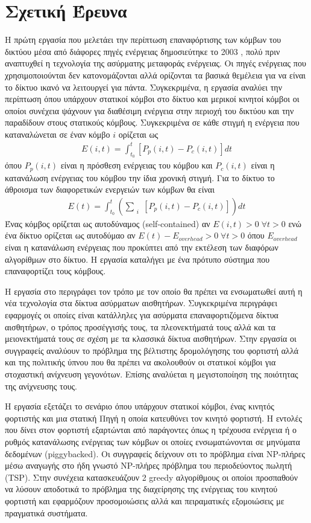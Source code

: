 \section{Σχετική Έρευνα}
Η πρώτη εργασία που μελετάει την περίπτωση επαναφόρτισης των κόμβων του δικτύου μέσα από διάφορες πηγές ενέργειας δημοσιεύτηκε το 2003 \cite{estrin_recharge}, πολύ
πριν αναπτυχθεί η τεχνολογία της ασύρματης μεταφοράς ενέργειας. Οι πηγές ενέργειας που χρησιμοποιούνται δεν κατονομάζονται αλλά ορίζονται τα βασικά θεμέλεια για να
είναι το δίκτυο ικανό να λειτουργεί για πάντα. Συγκεκριμένα, η εργασία αναλύει την περίπτωση όπου υπάρχουν στατικοί κόμβοι στο δίκτυο και μερικοί κινητοί κόμβοι οι
οποίοι συνέχεια ψάχνουν για διαθέσιμη ενέργεια στην περιοχή του δικτύου και την παραδίδουν στους στατικούς κόμβους.
Συγκεκριμένα σε κάθε στιγμή η ενέργεια που καταναλώνεται σε έναν κόμβο $i$ ορίζεται ως
\begin{align*}
E(i,t)=\int^{t}_{t_{0}}[P_{p}(i,t)-P_{c}(i,t)]dt
\end{align*}
όπου $P_{p}(i,t)$ είναι η πρόσθεση ενέργειας του κόμβου και $P_{c}(i,t)$ είναι η κατανάλωση ενέργειας του κόμβου την ίδια χρονική στιγμή. Για το δίκτυο το άθροισμα
των διαφορετικών ενεργειών των κόμβων θα είναι
\begin{align*}
E(t)=\int^{t}_{t_{0}}(\sum\limits_{\substack{i}}[P_{p}(i,t)-P_{c}(i,t)])dt
\end{align*}
Ένας κόμβος ορίζεται ως αυτοδύναμος (self-contained) αν $E(i,t)>0 \; \forall t>0$ ενώ ένα δίκτυο ορίζεται ως αυτοδύμαο αν $E(t)-E_{overhead}>0 \; \forall t>0$ όπου
$E_{overhead}$ είναι η κατανάλωση ενέργειας που προκύπτει από την εκτέλεση των διαφόρων αλγορίθμων στο δίκτυο. Η εργασία καταλήγει με ένα πρότυπο σύστημα που
επαναφορτίζει τους κόμβους.

Η εργασία στο \cite{smart_dust_revisited} περιγράφει τον τρόπο με τον οποίο θα πρέπει να ενσωματωθεί αυτή η νέα τεχνολογία στα δίκτυα ασύρματων αισθητήρων.
Συγκεκριμένα περιγράφει εφαρμογές οι οποίες είναι κατάλληλες για ασύρματα επαναφορτιζόμενα δίκτυα αισθητήρων, ο τρόπος προσέγγισής τους, τα πλεονεκτήματά τους αλλά
και τα μειονεκτήματά τους σε σχέση με τα κλασσικά δίκτυα αισθητήρων. Στην εργασία \cite{optimal_scheduling} οι συγγραφείς αναλύουν το πρόβλημα της βέλτιστης
δρομολόγησης του φορτιστή αλλά και της πολιτικής ύπνου που θα πρέπει να ακολουθούν οι στατικοί κόμβοι για στοχαστική ανίχνευση γεγονότων. Επίσης αναλύεται η
μεγιστοποίηση της ποιότητας της ανίχνευσης τους.

Η εργασία \cite{prolonging_j-roc} εξετάζει το σενάριο όπου υπάρχουν στατικοί κόμβοι, ένας κινητός φορτιστής και μια στατική Πηγή η οποία κατευθύνει τον κινητό
φορτιστή. Η εντολές που δίνει στον φορτιστή εξαρτώνται από παράγοντες όπως η τρέχουσα ενέργεια ή ο ρυθμός κατανάλωσης ενέργειας των κόμβων οι οποίες ενσωματώνονται σε
μηνύματα δεδομένων (piggybacked). Οι συγγραφείς δείχνουν οτι το πρόβλημα είναι NP-πλήρες μέσω αναγωγής στο ήδη γνωστό NP-πλήρες πρόβλημα του περιοδεύοντος πωλητή
(TSP). Στην συνέχεια κατασκευάζουν 2 greedy αλγορίθμους οι οποίοι προσπαθούν να λύσουν αποδοτικά το πρόβλημα της διαχείρησης της ενέργειας του κινητού φορτιστή και
εφαρμόζουν προσομοιώσεις αλλά και πειραματικές εξομοιώσεις με πραγματικά συστήματα.

